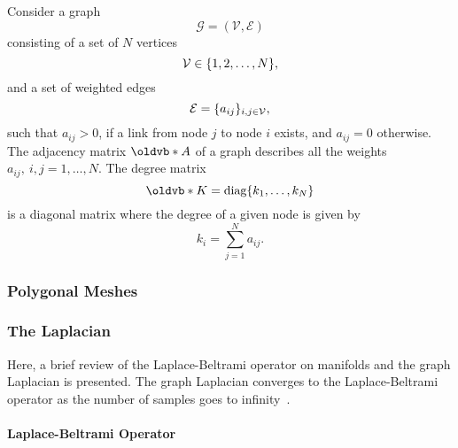 Consider a graph
%
\begin{equation}
	\mathcal{G}
	= (\mathcal{V}, \mathcal{E})
\end{equation}
%
consisting of a set of \(N\) vertices
%
\begin{equation}
	\mathcal{V}
	\in \{1,2,\ldots,N\},
\end{equation}
%
and a set of weighted edges
%
\begin{equation}
	\mathcal{E}
	= \{a_{i j}\}_{i,j \in \mathcal{V}},
\end{equation}
%
such that \(a_{i j} > 0\), if a link from node \(j\) to node \(i\) exists, and \(a_{i j} = 0\) otherwise.
The adjacency matrix \(\vb{A}\) of a graph describes all the weights \(a_{i j},\ i,j = 1,\ldots,N\).
The degree matrix
%
\begin{equation}
	\vb{K}
	= \diag{k_{1},\ldots,k_{N}}
\end{equation}
%
is a diagonal matrix where the degree of a given node is given by
%
\begin{equation}
	k_{i}
	= \sum\limits_{j=1}^{N} a_{i j}.
\end{equation}

\subsubsection{Polygonal Meshes}

\subsubsection{The Laplacian}

Here, a brief review of the Laplace-Beltrami operator on manifolds and the graph Laplacian is presented.
The graph Laplacian converges to the Laplace-Beltrami operator as the number of samples goes to infinity~\cite{Belkin2007}.

\paragraph{Laplace-Beltrami Operator}

